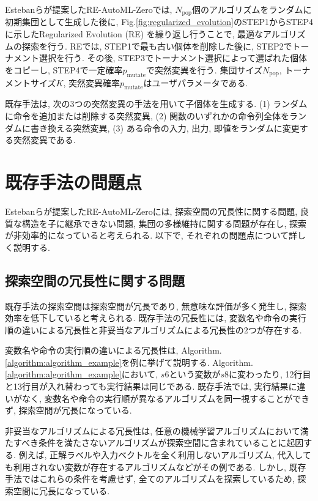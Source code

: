 \documentclass[a4paper,11pt,twocolumn]{jarticle}
\begin{document}
Estebanらが提案したRE-AutoML-Zeroでは, $N_\mathrm{pop}$個のアルゴリズムをランダムに初期集団として生成した後に, Fig.\ref{fig:regularized_evolution}のSTEP1からSTEP4に示したRegularized Evolution (RE) を繰り返し行うことで, 最適なアルゴリズムの探索を行う. REでは, STEP1で最も古い個体を削除した後に, STEP2でトーナメント選択を行う. その後, STEP3でトーナメント選択によって選ばれた個体をコピーし, STEP4で一定確率$p_\mathrm{mutate}$で突然変異を行う. 集団サイズ$N_\mathrm{pop}$, トーナメントサイズ$K$, 突然変異確率$p_\mathrm{mutate}$はユーザパラメータである.

既存手法は, 次の3つの突然変異の手法を用いて子個体を生成する. (1) ランダムに命令を追加または削除する突然変異, (2) 関数のいずれかの命令列全体をランダムに書き換える突然変異, (3) ある命令の入力, 出力, 即値をランダムに変更する突然変異である.

\section{既存手法の問題点}\label{sec:existing_problem}

Estebanらが提案したRE-AutoML-Zeroには, 探索空間の冗長性に関する問題, 良質な構造を子に継承できない問題, 集団の多様維持に関する問題が存在し, 探索が非効率的になっていると考えられる. 以下で, それぞれの問題点について詳しく説明する.

\subsection{探索空間の冗長性に関する問題}\label{subsec:existing_problem:space}

既存手法の探索空間は探索空間が冗長であり, 無意味な評価が多く発生し, 探索効率を低下していると考えられる. 既存手法の冗長性には, 変数名や命令の実行順の違いによる冗長性と非妥当なアルゴリズムによる冗長性の2つが存在する.

変数名や命令の実行順の違いによる冗長性は, Algorithm.\ref{algorithm:algorithm_example}を例に挙げて説明する. Algorithm.\ref{algorithm:algorithm_example}において, $s6$という変数が$s8$に変わったり, 12行目と13行目が入れ替わっても実行結果は同じである. 既存手法では, 実行結果に違いがなく, 変数名や命令の実行順が異なるアルゴリズムを同一視することができず,  探索空間が冗長になっている.

非妥当なアルゴリズムによる冗長性は, 任意の機械学習アルゴリズムにおいて満たすべき条件を満たさないアルゴリズムが探索空間に含まれていることに起因する. 例えば, 正解ラベルや入力ベクトルを全く利用しないアルゴリズム, 代入しても利用されない変数が存在するアルゴリズムなどがその例である. しかし, 既存手法ではこれらの条件を考慮せず, 全てのアルゴリズムを探索しているため, 探索空間に冗長になっている.
\end{document}
